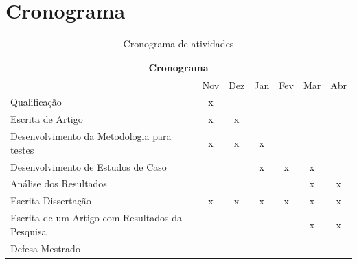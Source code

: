 \section{Cronograma}

\begin{table}[ht]
\centering
\caption{Cronograma de atividades}
\label{my-label}
\begin{tabular}{|l|c|c|c|c|c|c|}
\hline
\multicolumn{7}{|c|}{Cronograma}                                                                                                                                                                                  \\ \hline
                                                & \multicolumn{1}{l|}{Nov} & \multicolumn{1}{l|}{Dez} & \multicolumn{1}{l|}{Jan} & \multicolumn{1}{l|}{Fev} & \multicolumn{1}{l|}{Mar} & \multicolumn{1}{l|}{Abr} \\ \hline
Qualificação                                    & x                        &                          &                          &                          &                          &                          \\ \hline
Escrita de Artigo                               & x                        & x                        &                          &                          &                          &                          \\ \hline
Desenvolvimento da Metodologia para testes      & x                        & x                        & x                        &                          &                          &                          \\ \hline
Desenvolvimento de Estudos de Caso              &                          &                          & x                        & x                        & x                        &                          \\ \hline
Análise dos Resultados                          &                          &                          &                          &                          & x                        & x                        \\ \hline
Escrita Dissertação                             & x                        & x                        & x                        & x                        & x                        & x                        \\ \hline
Escrita de um Artigo com Resultados da Pesquisa &                          &                          &                          &                          & x                        & x                        \\ \hline
Defesa Mestrado                                 &                          &                          &                          &                          &                          &                          \\ \hline
\end{tabular}
\end{table}
